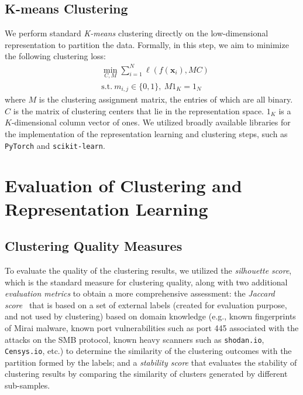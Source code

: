 \documentclass[manuscript, nonacm]{acmart}
\newcommand{\ie}{\mbox{{i.e.,\ }}}
\newcommand{\bx}{\bm{x}}%
\begin{document}
\subsection{K-means Clustering} We perform standard \emph{K-means} clustering directly on the low-dimensional representation 
to partition the data. Formally, in this step, we aim to minimize the following clustering loss:
\begin{align}
\label{eq:kmeans}
    &\min_{C,M} \sum_{i=1}^N \ell(f(\bx_i), MC) \\
    &\mathrm{s.t.}~m_{i,j}\in \{0,1\},~ M 1_{K} = 1_{N} \nonumber
\end{align}
where $M$ is the clustering assignment matrix, the entries of which are all binary. $C$ is the matrix of clustering centers that lie in the representation space. $1_{K}$ is a $K$-dimensional column vector of ones. 
We utilized broadly available libraries for the implementation
of the representation learning and clustering steps, such as \texttt{PyTorch}
and \texttt{scikit-learn}.


\section{Evaluation of Clustering and Representation Learning}
\label{sec:peava}

\subsection{Clustering Quality Measures}

To evaluate the quality of the clustering results, 
we utilized the \emph{silhouette score}, which is the standard measure for clustering quality,
along with two additional \emph{evaluation metrics} to obtain a more
comprehensive assessment: 
the \emph{Jaccard score}~\cite{halkidi2001survey} that is based on 
a set of external labels (created for evaluation purpose, 
and not used by clustering) based on domain knowledge (e.g., known
fingerprints of Mirai malware, known port vulnerabilities
such as port 445 associated with the attacks on the SMB protocol, 
known heavy scanners such as \texttt{shodan.io}, \texttt{Censys.io}, etc.) 
to determine the similarity of the clustering
outcomes with the partition formed by the labels; 
and a \emph{stability score} that evaluates the stability of clustering results by comparing the similarity of clusters generated by different sub-samples.
\end{document}
